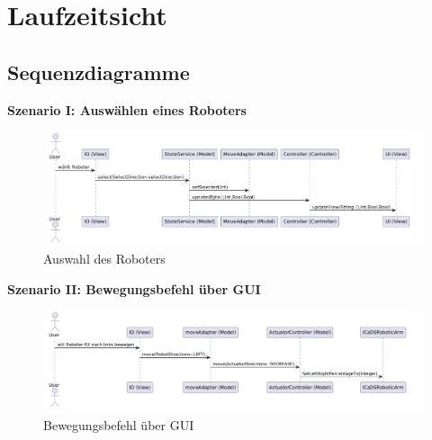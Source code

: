
\chapter{Laufzeitsicht}

\section{Sequenzdiagramme}
\textbf{Szenario I: Auswählen eines Roboters}\\

\begin{figure}[h]
    \centering
    \includegraphics[width=0.8\linewidth]{diagrams/selectRobot_140725.png}
    \caption{Auswahl des Roboters}
    \label{fig:Auswahl}
\end{figure}

\clearpage\textbf{Szenario II: Bewegungsbefehl über GUI}\\

\begin{figure}[h]  
    \centering
    \includegraphics[width=0.8\linewidth]{diagrams/moveBefehl250625.png}
    \caption{Bewegungsbefehl über GUI}
    \label{fig:Bewegungsbefehl}
\end{figure}









